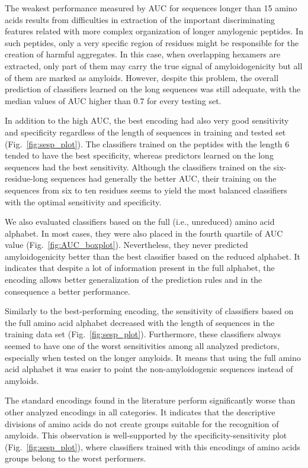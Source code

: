\documentclass[a4,center,fleqn]{NAR}
\begin{document}
 The weakest performance measured by AUC for sequences longer than 15 amino acids results from difficulties in extraction of  the important discriminating features related with more complex organization of longer amylogenic peptides. In such peptides, only a very specific region of residues 
might be responsible for the creation of harmful aggregates. In this case, when 
overlapping hexamers are extracted, only part of them may carry the true signal 
of amyloidogenicity but all of them are marked as amyloids. However, despite this problem, the 
overall prediction of classifiers learned on the long sequences was still 
adequate, with the median values of AUC higher than 0.7 for every testing set. 

  In addition to the high AUC, the best encoding had also very good sensitivity 
and specificity regardless of the length of sequences in training and tested 
set (Fig.~\ref{fig:sesp_plot}). The classifiers trained on the peptides with the 
length 6 tended to have the best specificity, whereas predictors learned on the 
long sequences had the best sensitivity. Although the classifiers trained on the
six-residue-long sequences had generally the better AUC, their training on the sequences 
from six to ten residues seems to yield the most balanced classifiers 
with the optimal sensitivity and specificity.

  We also evaluated classifiers based on the full (i.e., unreduced) amino acid alphabet. In most 
cases, they were also placed in the fourth quartile of AUC value 
(Fig.~\ref{fig:AUC_boxplot}). Nevertheless, they never predicted 
amyloidogenicity better than the best classifier based on the reduced alphabet. It indicates that despite 
a lot of information present in the full alphabet, the encoding allows better 
generalization of the prediction rules and in the consequence a better 
performance.

  Similarly to the best-performing encoding, the sensitivity of classifiers 
based on the full amino acid alphabet decreased with the length of sequences in 
the training data set (Fig.~\ref{fig:sesp_plot}). Furthermore, these 
classifiers always seemed to  have one of the worst sensitivities among all analyzed 
predictors, especially when tested on the longer amyloids. It means that using the 
full amino acid alphabet it was easier to point the non-amyloidogenic sequences 
instead of amyloids.

  The standard encodings found in the literature perform significantly worse than other 
analyzed encodings in all categories. It indicates that the descriptive divisions 
of amino acids do not create groups suitable for the recognition of amyloids. This 
observation is well-supported by the specificity-sensitivity plot 
(Fig.~\ref{fig:sesp_plot}), where classifiers trained with this encodings of 
amino acids groups belong to the worst performers.
%
%
\end{document}
